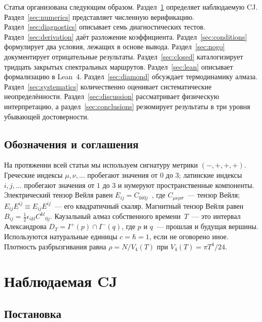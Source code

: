 \documentclass[12pt,a4paper]{article}
\theoremstyle{plain}
\theoremstyle{definition}
\theoremstyle{remark}
\newcommand{\Esq}{E_{ij}E^{ij}}
\begin{document}
Статья организована следующим образом.
Раздел~\ref{sec:observable} определяет наблюдаемую CJ.
Раздел~\ref{sec:numerics} представляет численную верификацию.
Раздел~\ref{sec:diagnostics} описывает семь
диагностических тестов.  Раздел~\ref{sec:derivation}
даёт разложение коэффициента.
Раздел~\ref{sec:conditions} формулирует два условия,
лежащих в основе вывода.
Раздел~\ref{sec:nogo} документирует отрицательные результаты.
Раздел~\ref{sec:closed} каталогизирует тридцать закрытых
спектральных маршрутов.  Раздел~\ref{sec:lean} описывает
формализацию в Lean~4.  Раздел~\ref{sec:diamond} обсуждает
термодинамику алмаза.  Раздел~\ref{sec:systematics}
количественно оценивает систематические неопределённости.
Раздел~\ref{sec:discussion} рассматривает физическую
интерпретацию, а раздел~\ref{sec:conclusions} резюмирует
результаты в три уровня убывающей достоверности.

\subsection*{Обозначения и соглашения}

На протяжении всей статьи мы используем сигнатуру метрики
$(-,+,+,+)$.  Греческие индексы $\mu, \nu, \ldots$
пробегают значения от $0$ до $3$; латинские индексы
$i, j, \ldots$ пробегают значения от $1$ до $3$ и нумеруют
пространственные компоненты.  Электрический тензор Вейля
равен $E_{ij} = C_{0i0j}$~\cite{Ehlers:1961}, где
$C_{\mu\nu\rho\sigma}$~--- тензор Вейля;
$\Esq \equiv E_{ij}E^{ij}$~--- его квадратичный
скаляр.  Магнитный тензор Вейля равен
$B_{ij} = \frac{1}{2}\epsilon_{ikl}C^{kl}{}_{0j}$.
Каузальный алмаз собственного времени~$T$~--- это
интервал Александрова $D_T = I^+(p) \cap I^-(q)$, где
$p$ и $q$~--- прошлая и будущая вершины.
Используются натуральные единицы $c = \hbar = 1$, если
не оговорено иное.  Плотность разбрызгивания равна
$\rho = N / V_4(T)$ при $V_4(T) = \pi T^4/24$.

\section{Наблюдаемая CJ}
\label{sec:observable}

\subsection{Постановка}
\label{sec:setup}
\end{document}
